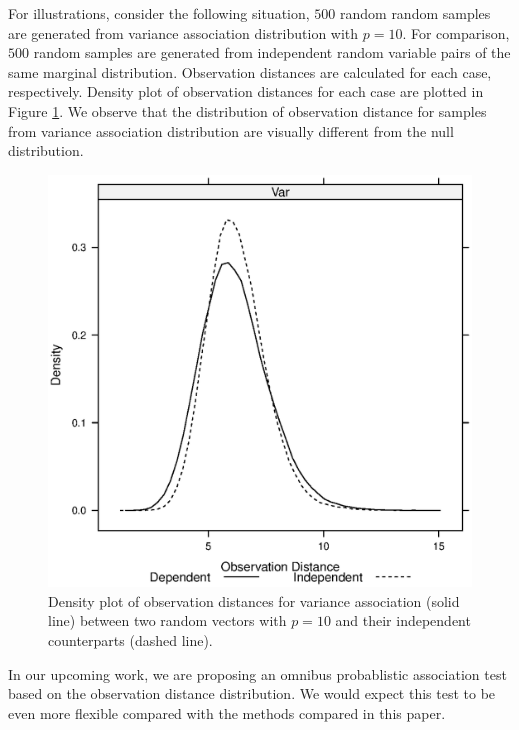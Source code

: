 \documentclass{sig-alternate}
\begin{document}
For illustrations, consider the following situation, $500$ random
\iid{} random samples are generated from variance association
distribution with $p=10$. For comparison, $500$ random samples are
generated from independent random variable pairs of the same marginal
distribution. Observation distances are calculated for each case,
respectively. Density plot of observation distances for each case are
plotted in Figure \ref{fig:discussion-distance-distribution}. We
observe that the distribution of observation distance for samples from
variance association distribution are visually different from the null
distribution.
\begin{figure}
  \centering
  \includegraphics[width=.25\textwidth,height=.25\textwidth]{../code/visualize/plot/distance-dist.eps}
  \caption{Density plot of observation distances for variance
    association (solid line) between two random vectors with $p=10$
    and their independent counterparts (dashed line).}
  \label{fig:discussion-distance-distribution}
\end{figure}
In our upcoming work, we are proposing an omnibus probablistic
association test based on the observation distance distribution. We
would expect this test to be even more flexible compared with the
methods compared in this paper. 



\end{document}
